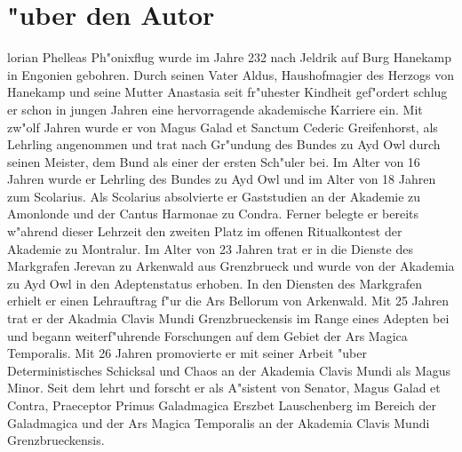 \documentclass[a5paper,8pt]{book}
\begin{document}
\chapter{ "uber den Autor}

lorian Phelleas Ph"onixflug wurde im Jahre 232 nach Jeldrik auf Burg Hanekamp in Engonien gebohren. Durch seinen Vater Aldus, Haushofmagier des Herzogs von Hanekamp und seine Mutter Anastasia seit fr"uhester Kindheit gef"ordert schlug er schon in jungen Jahren eine hervorragende akademische Karriere ein.
Mit zw"olf Jahren wurde er von Magus Galad et Sanctum Cederic Greifenhorst, als Lehrling angenommen und trat nach Gr"undung des Bundes zu Ayd Owl durch seinen Meister, dem Bund als einer der ersten Sch"uler bei. Im Alter von 16 Jahren wurde er Lehrling des Bundes zu Ayd Owl und im Alter von 18 Jahren zum Scolarius.
Als Scolarius absolvierte er Gaststudien an der Akademie zu Amonlonde und der Cantus Harmonae zu Condra. Ferner belegte er bereits w"ahrend dieser Lehrzeit den zweiten Platz im offenen Ritualkontest der Akademie zu Montralur.
Im Alter von 23 Jahren trat er in die Dienste des Markgrafen Jerevan zu Arkenwald aus Grenzbrueck und wurde von der Akademia zu Ayd Owl in den Adeptenstatus erhoben. In den Diensten des Markgrafen erhielt er einen Lehrauftrag f"ur die Ars Bellorum von Arkenwald.
Mit 25 Jahren trat er der Akadmia Clavis Mundi Grenzbrueckensis im Range eines Adepten bei und begann weiterf"uhrende Forschungen auf dem Gebiet der Ars Magica Temporalis.
Mit 26 Jahren promovierte er mit seiner Arbeit "uber Deterministisches Schicksal und Chaos an der Akademia Clavis Mundi als Magus Minor.
Seit dem lehrt und forscht er als A"sistent von Senator, Magus Galad et Contra, Praeceptor Primus Galadmagica Erszbet Lauschenberg im Bereich der Galadmagica und der Ars Magica Temporalis an der Akademia Clavis Mundi Grenzbrueckensis.
\end{document}
